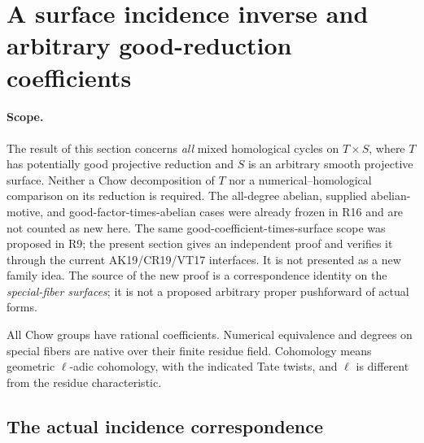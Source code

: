 \section{A surface incidence inverse and arbitrary good-reduction coefficients}
\label{r20as:section}

\paragraph{Scope.}
The result of this section concerns \emph{all} mixed homological cycles
on $T\times S$, where $T$ has potentially good projective reduction and
$S$ is an arbitrary smooth projective surface.  Neither a Chow
decomposition of $T$ nor a numerical--homological comparison on its
reduction is required.  The all-degree abelian, supplied abelian-motive,
and good-factor-times-abelian cases were already frozen in R16 and
are not counted as new here.  The same good-coefficient-times-surface
scope was proposed in R9; the present section gives an independent
proof and verifies it through the current AK19/CR19/VT17 interfaces.
It is not presented as a new family idea.  The source of the new proof is a
correspondence identity on the \emph{special-fiber surfaces}; it is
not a proposed arbitrary proper pushforward of actual forms.

All Chow groups have rational coefficients.  Numerical equivalence
and degrees on special fibers are native over their finite residue
field.  Cohomology means geometric $\ell$-adic cohomology, with the
indicated Tate twists, and $\ell$ is different from the residue
characteristic.

\subsection{The actual incidence correspondence}

